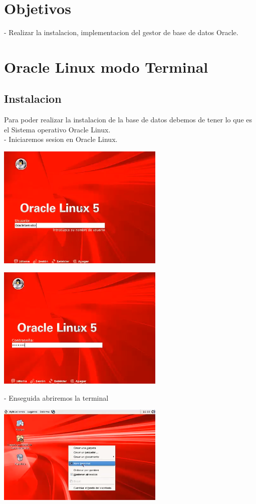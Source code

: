 \documentclass[12pt,letterpaper]{article}
\begin{document}
 \newpage
\section{Objetivos} 
- Realizar la instalacion, implementacion del gestor de base de datos Oracle.
\newpage
\section{Oracle Linux modo Terminal}
\subsection{Instalacion}
Para poder realizar la instalacion de la base de datos  debemos de tener lo que es el Sistema operativo Oracle Linux. \\
- Iniciaremos sesion en Oracle Linux. \\
\begin{center}
\includegraphics[width=8cm]{IMG/oracle1.png} 
\end{center}

\begin{center}
\includegraphics[width=8cm]{IMG/oracle2.png} 
\end{center}
- Enseguida abriremos la terminal \\

\begin{center}
\includegraphics[width=8cm]{IMG/oracle3.png} 
\end{center}
\end{document}
